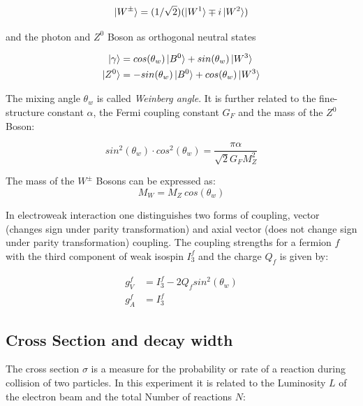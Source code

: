 \begin{equation}
\ket{W^{\pm}}=(1/\sqrt{2}) (\ket{W^1}\mp i\ket{W^2})
\end{equation}

and the photon and $Z^0$ Boson as orthogonal neutral states\cite{Grif}

\begin{equation}
\begin{aligned}
\ket{\gamma} &=  cos(\theta_w)\ket{B^0} + sin(\theta_w) \ket{W^3}\\
\ket{Z^0} &= -sin(\theta_w) \ket{B^0} + cos(\theta_w) \ket{W^3}
\end{aligned}
\end{equation}

The mixing angle $\theta_w$ is called \emph{Weinberg angle}. It is further related to the fine-structure constant  $\alpha$, the Fermi coupling constant $G_F$ and the mass of the $Z^0$ Boson\cite{muenchen}:

\begin{equation}
sin^2(\theta_w)\cdot cos^2(\theta_w) = \frac{\pi\alpha}{\sqrt{2}G_FM_Z^2}
\end{equation}

The mass of the $W^{\pm}$ Bosons can be expressed as:
\begin{equation}
M_W = M_Z~cos(\theta_w)
\end{equation}

In electroweak interaction one distinguishes two forms of coupling, vector (changes sign under parity transformation) and axial vector (does not change sign under parity transformation) coupling. The coupling strengths for a fermion $f$ with the third component of weak isospin $I^f_3$ and the charge $Q_f$ is given by\cite{muenchen}:

\begin{equation}
\begin{aligned}
g_V^f &= I^f_3-2 Q_f sin^2(\theta_w)\\
g_A^f &= I^f_3
\end{aligned}
\label{eq:principles:coupling strengths}
\end{equation}

\subsection{Cross Section and decay width}
The cross section $\sigma$ is a measure for the probability or rate of a reaction during collision of two particles. In this experiment it is related to the Luminosity $L$ of the electron beam and the total Number of reactions $N$:

